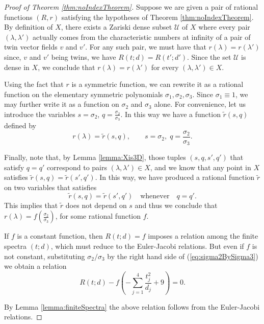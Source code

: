 \documentclass[phd,tocprelim]{cornell}
\begin{document}
\begin{proof}[Proof of Theorem \ref*{thm:noIndexTheorem}]
Suppose we are given a pair of rational functions $(R,r)$ satisfying the hypotheses of Theorem \ref{thm:noIndexTheorem}. By definition of $X$, there exists a Zariski dense subset $\mathcal{U}$ of $X$ where every pair $(\lambda,\lambda')$ actually comes from the characteristic numbers at infinity of a pair of twin vector fields $v$ and $v'$. For any such pair, we must have that $r(\lambda)=r(\lambda')$ since, $v$ and $v'$ being twins, we have $R(t;d)=R(t';d')$. Since the set $\mathcal{U}$ is dense in $X$, we conclude that $r(\lambda)=r(\lambda')$ for every $(\lambda,\lambda')\in X$.

Using the fact that $r$ is a symmetric function, we can rewrite it as a rational function on the elementary symmetric polynomials $\sigma_1,\sigma_2,\sigma_3$. Since $\sigma_1\equiv 1$, we may further write it as a function on $\sigma_2$ and $\sigma_3$ alone. For convenience, let us introduce the variables $s=\sigma_2$, $q=\frac{\sigma_2}{\sigma_3}$. In this way we have a function $\tilde{r}(s,q)$ defined by
 \[ r(\lambda)=\tilde{r}(s,q), \qquad s=\sigma_2,\; q=\frac{\sigma_2}{\sigma_3}. \]

Finally, note that, by Lemma \ref{lemma:Xis3D}, those tuples $(s,q,s',q')$ that satisfy $q=q'$ correspond to pairs $(\lambda,\lambda')\in X$, and we know that any point in $X$ satisfies $\tilde{r}(s,q)=\tilde{r}(s',q')$. In this way, we have produced a rational function $\tilde{r}$ on two variables that satisfies 
 \[ \tilde{r}(s,q)=\tilde{r}(s',q') \quad \text{whenever} \quad q=q'. \]
This implies that $\tilde{r}$ does not depend on $s$ and thus we conclude that $r(\lambda)=f(\frac{\sigma_2}{\sigma_3})$, for some rational function $f$.

If $f$ is a constant function, then $R(t;d)=f$ imposes a relation among the finite spectra $(t;d)$, which must reduce to the Euler-Jacobi relations. But even if $f$ is not constant, substituting $\sigma_2/\sigma_3$ by the right hand side of (\ref{eq:sigma2BySigma3}) we obtain a relation
 \[ R(t;d) - f \left(-\sum_{j=1}^4\frac{t_j^2}{d_j} +9 \right) = 0. \]
 
By Lemma \ref{lemma:finiteSpectra} the above relation follows from the Euler-Jacobi relations.
\end{proof}
\end{document}
